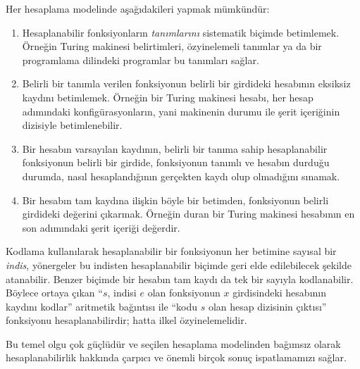 


Her hesaplama modelinde aşağıdakileri yapmak mümkündür:
\begin{enumerate}
\item Hesaplanabilir fonksiyonların \emph{tanımlarını} sistematik biçimde
  betimlemek. Örneğin Turing makinesi belirtimleri, özyinelemeli tanımlar ya
  da bir programlama dilindeki programlar bu tanımları sağlar.
\item Belirli bir tanımla verilen fonksiyonun belirli bir girdideki hesabının
  eksiksiz kaydını betimlemek. Örneğin bir Turing makinesi hesabı, her hesap
  adımındaki konfigürasyonların, yani makinenin durumu ile şerit içeriğinin
  dizisiyle betimlenebilir.
\item Bir hesabın varsayılan kaydının, belirli bir tanıma sahip hesaplanabilir
  fonksiyonun belirli bir girdide, fonksiyonun tanımlı ve hesabın durduğu
  durumda, nasıl hesaplandığının gerçekten kaydı olup olmadığını sınamak.
\item Bir hesabın tam kaydına ilişkin böyle bir betimden, fonksiyonun belirli
  girdideki değerini çıkarmak. Örneğin duran bir Turing makinesi hesabının
  en son adımındaki şerit içeriği değerdir.
\end{enumerate}

Kodlama kullanılarak hesaplanabilir bir fonksiyonun her betimine sayısal bir
\emph{indis}, yönergeler bu indisten hesaplanabilir biçimde geri elde
edilebilecek şekilde atanabilir. Benzer biçimde bir hesabın tam kaydı da tek
bir sayıyla kodlanabilir. Böylece ortaya çıkan ``$s$, indisi $e$ olan
fonksiyonun $x$ girdisindeki hesabının kaydını kodlar'' aritmetik bağıntısı
ile ``kodu $s$ olan hesap dizisinin çıktısı'' fonksiyonu hesaplanabilirdir;
hatta ilkel özyinelemelidir.

Bu temel olgu çok güçlüdür ve seçilen hesaplama modelinden bağımsız olarak
hesaplanabilirlik hakkında çarpıcı ve önemli birçok sonuç ispatlamamızı
sağlar.

